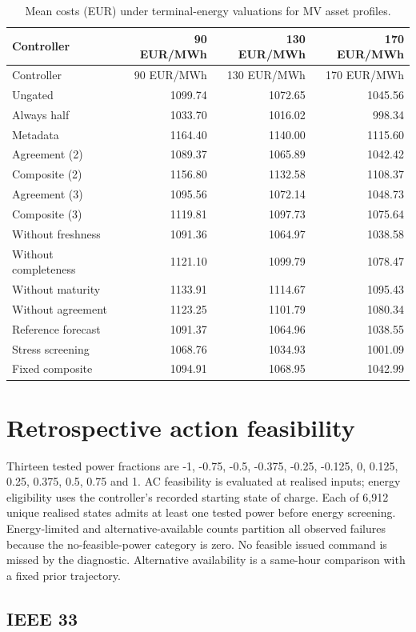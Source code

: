 \documentclass[11pt]{article}
\begin{document}
\small\begin{longtable}{lrrr}
\caption{Mean costs (EUR) under terminal-energy valuations for MV asset profiles.}\\\toprule
Controller & 90 EUR/MWh & 130 EUR/MWh & 170 EUR/MWh\\\midrule
\endfirsthead
\toprule
Controller & 90 EUR/MWh & 130 EUR/MWh & 170 EUR/MWh\\\midrule
\endhead
\bottomrule\endfoot
Ungated & 1099.74 & 1072.65 & 1045.56\\
Always half & 1033.70 & 1016.02 & 998.34\\
Metadata & 1164.40 & 1140.00 & 1115.60\\
Agreement (2) & 1089.37 & 1065.89 & 1042.42\\
Composite (2) & 1156.80 & 1132.58 & 1108.37\\
Agreement (3) & 1095.56 & 1072.14 & 1048.73\\
Composite (3) & 1119.81 & 1097.73 & 1075.64\\
Without freshness & 1091.36 & 1064.97 & 1038.58\\
Without completeness & 1121.10 & 1099.79 & 1078.47\\
Without maturity & 1133.91 & 1114.67 & 1095.43\\
Without agreement & 1123.25 & 1101.79 & 1080.34\\
Reference forecast & 1091.37 & 1064.96 & 1038.55\\
Stress screening & 1068.76 & 1034.93 & 1001.09\\
Fixed composite & 1094.91 & 1068.95 & 1042.99\\
\end{longtable}\normalsize
\section{Retrospective action feasibility}
Thirteen tested power fractions are -1, -0.75, -0.5, -0.375, -0.25, -0.125, 0, 0.125, 0.25, 0.375, 0.5, 0.75 and 1. AC feasibility is evaluated at realised inputs; energy eligibility uses the controller's recorded starting state of charge. Each of 6,912 unique realised states admits at least one tested power before energy screening. Energy-limited and alternative-available counts partition all observed failures because the no-feasible-power category is zero. No feasible issued command is missed by the diagnostic. Alternative availability is a same-hour comparison with a fixed prior trajectory.
\subsection{IEEE 33}
\end{document}
